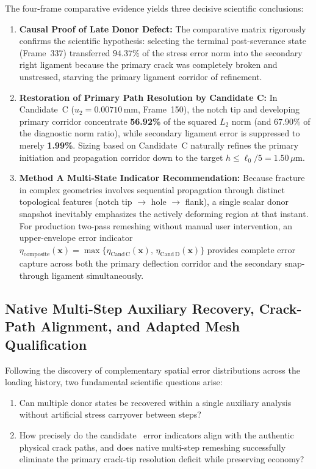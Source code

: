 The four-frame comparative evidence yields three decisive scientific conclusions:
\begin{enumerate}
  \item \textbf{Causal Proof of Late Donor Defect:} The comparative matrix rigorously confirms the scientific hypothesis: selecting the terminal post-severance state (Frame~337) transferred $94.37\%$ of the stress error norm into the secondary right ligament because the primary crack was completely broken and unstressed, starving the primary ligament corridor of refinement.
  \item \textbf{Restoration of Primary Path Resolution by Candidate C:} In Candidate~C ($u_2 = 0.00710\,\mathrm{mm}$, Frame~150), the notch tip and developing primary corridor concentrate \textbf{56.92\%} of the squared $L_2$ norm (and $67.90\%$ of the diagnostic norm ratio), while secondary ligament error is suppressed to merely \textbf{1.99\%}. Sizing based on Candidate~C naturally refines the primary initiation and propagation corridor down to the target $h \le \ell_0 / 5 = 1.50\,\mu\mathrm{m}$.
  \item \textbf{Method A Multi-State Indicator Recommendation:} Because fracture in complex geometries involves sequential propagation through distinct topological features (notch tip $\to$ hole $\to$ flank), a single scalar donor snapshot inevitably emphasizes the actively deforming region at that instant. For production two-pass remeshing without manual user intervention, an upper-envelope error indicator $\eta_{\mathrm{composite}}(\mathbf{x}) = \max \{ \eta_{\mathrm{Cand\,C}}(\mathbf{x}),\, \eta_{\mathrm{Cand\,D}}(\mathbf{x}) \}$ provides complete error capture across both the primary deflection corridor and the secondary snap-through ligament simultaneously.
\end{enumerate}

\subsection{Native Multi-Step Auxiliary Recovery, Crack-Path Alignment, and Adapted Mesh Qualification}
\label{subsec:hole_multistep_native_remeshing}

Following the discovery of complementary spatial error distributions across the loading history, two fundamental scientific questions arise:
\begin{enumerate}
  \item Can multiple donor states be recovered within a single auxiliary \Abaqus analysis without artificial stress carryover between steps?
  \item How precisely do the candidate \MISESERI\ error indicators align with the authentic physical crack paths, and does native multi-step remeshing successfully eliminate the primary crack-tip resolution deficit while preserving economy?
\end{enumerate}

